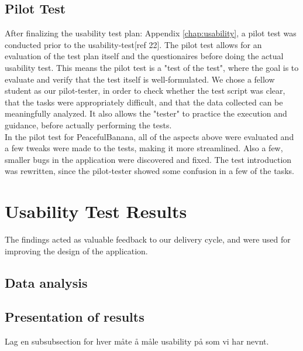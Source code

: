 \subsection{Pilot Test}
After finalizing the usability test plan: Appendix \ref{chap:usability}, a pilot test was conducted prior to the usability-test[ref 22]. The pilot test allows for an evaluation of the test plan itself and the questionaires before doing the actual usability test. This means the pilot test is a "test of the test", where the goal is to evaluate and verify that the test itself is well-formulated. We chose a fellow student as our pilot-tester, in order to check whether the test script was clear, that the tasks were appropriately difficult, and that the data collected can be meaningfully analyzed. 
It also allows the "tester" to practice the execution and guidance, before actually performing the tests. \\
In the pilot test for PeacefulBanana, all of the aspects above were evaluated and a few tweaks were made to the tests, making it more streamlined. Also a few, smaller bugs in the application were discovered and fixed. The test introduction was rewritten, since the pilot-tester showed some confusion in a few of the tasks. 

\section{Usability Test Results}
The findings acted as valuable feedback to our delivery cycle, and were used for improving the design of the application. 
\subsection{Data analysis}
\subsection{Presentation of results}
Lag en subsubsection for hver måte å måle usability på som vi har nevnt. 
